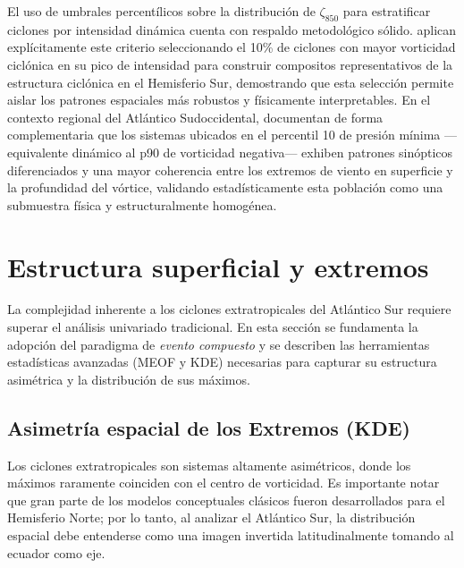 El uso de umbrales percentílicos sobre la distribución de $\zeta_{850}$ para estratificar ciclones por intensidad dinámica cuenta con respaldo metodológico sólido. \citet{priestley2022improved} aplican explícitamente este criterio seleccionando el 10\% de ciclones con mayor vorticidad ciclónica en su pico de intensidad para construir compositos representativos de la estructura ciclónica en el Hemisferio Sur, demostrando que esta selección permite aislar los patrones espaciales más robustos y físicamente interpretables. En el contexto regional del Atlántico Sudoccidental, \citet{andrade2024composite} documentan de forma complementaria que los sistemas ubicados en el percentil 10 de presión mínima —equivalente dinámico al p90 de vorticidad negativa— exhiben patrones sinópticos diferenciados y una mayor coherencia entre los extremos de viento en superficie y la profundidad del vórtice, validando estadísticamente esta población como una submuestra física y estructuralmente homogénea.


\section{Estructura superficial y extremos}\label{sec:tb_compuestos}
La complejidad inherente a los ciclones extratropicales del Atlántico Sur requiere superar el análisis univariado tradicional. En esta sección se fundamenta la adopción del paradigma de \textit{evento compuesto} y se describen las herramientas estadísticas avanzadas (MEOF y KDE) necesarias para capturar su estructura asimétrica y la distribución de sus máximos.

\subsection{Asimetría espacial de los Extremos (KDE)}\label{subsec:tb_kde_asimetria}
Los ciclones extratropicales son sistemas altamente asimétricos, donde los máximos raramente coinciden con el centro de vorticidad. Es importante notar que gran parte de los modelos conceptuales clásicos fueron desarrollados para el Hemisferio Norte; por lo tanto, al analizar el Atlántico Sur, la distribución espacial debe entenderse como una imagen invertida latitudinalmente tomando al ecuador como eje.

